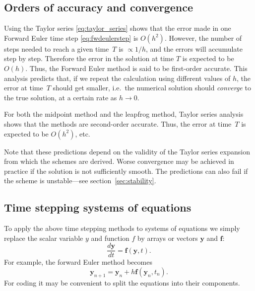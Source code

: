 \subsection{Orders of accuracy and convergence}

Using the Taylor series \eqref{eq:taylor_series} shows that the error made in
one Forward Euler time step \eqref{eq:fwdeulerstep} is
$O(h^2)$. However, the number of steps needed to reach a given time~$T$
is $\propto 1/h$, and the errors will accumulate step by step.
Therefore the error in the solution at time $T$ is 
expected to be $O(h)$. Thus, the Forward Euler method is said to be first-order
accurate.
This analysis predicts that, if we repeat the calculation using different values of $h$,
the error at time~$T$ should get smaller, i.e.\ the numerical solution should {\it converge}
to the true solution, at a certain rate as $h \rightarrow 0$.

For both the midpoint method and the leapfrog method, Taylor series analysis
shows that the methods are second-order accurate. Thus, the error at time~$T$
is expected to be $O(h^2)$, etc.

Note that these predictions depend on the validity of the Taylor series expansion
from which the schemes are derived. Worse convergence may be achieved in practice
if the solution is not sufficiently smooth.
The predictions can also fail if the scheme is unstable---see section~\ref{sec:stability}.


\subsection{Time stepping systems of equations}
\label{sec:step_systems}

To apply the above time stepping methods to systems of equations we simply
replace the scalar variable $y$ and function $f$ by arrays or vectors
$\boldsymbol{y}$ and $\boldsymbol{f}$:
\begin{equation}
\label{eq:ODE12}
\frac{d \boldsymbol{y}}{d t} = \boldsymbol{f}(\boldsymbol{y},t) .
\end{equation}
For example, the forward Euler method becomes
\begin{equation}
\boldsymbol{y}_{n+1} = \boldsymbol{y}_n + h \boldsymbol{f}(\boldsymbol{y}_n, t_n) .
\label{eq:fwdeulerstepsys}
\end{equation}
For coding it may be convenient to split the equations into their components.


